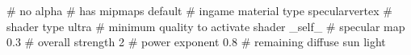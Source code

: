 # no alpha
# has mipmaps
default			 # ingame material type
specularvertex	         # shader type
ultra			 # minimum quality to activate shader
_self_			 # specular map
0.3 			 # overall strength
2		 # power exponent
0.8		 # remaining diffuse sun light



